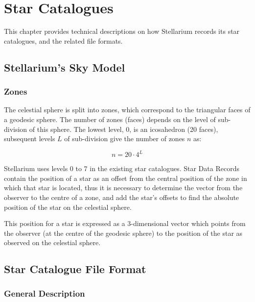 
\chapter{Star Catalogues}
\label{ch:Catalogues}

This chapter provides technical descriptions on how Stellarium records its star catalogues, and
the related file formats.

\section{Stellarium's Sky Model}
\label{sec:Catalogues:SkyModel}

\subsection{Zones}
\label{sec:Catalogues:SkyModel:Zones}

The celestial sphere is split into zones, which correspond to the
triangular faces of a geodesic sphere. The number of zones (faces)
depends on the level of sub-division of this sphere. The lowest level,
0, is an icosahedron (20 faces), subsequent levels $L$ of sub-division
give the number of zones $n$ as:

\begin{equation}
n=20 \cdot 4^L
\end{equation}

Stellarium uses levels 0 to 7 in the existing star catalogues. Star Data
Records contain the position of a star as an offset from the central
position of the zone in which that star is located, thus it is necessary
to determine the vector from the observer to the centre of a zone, and
add the star's offsets to find the absolute position of the star on the
celestial sphere.

This position for a star is expressed as a 3-dimensional vector which
points from the observer (at the centre of the geodesic sphere) to the
position of the star as observed on the celestial sphere.

\section{Star Catalogue File Format}%
\label{sec:Catalogues:stars}

\subsection{General Description}%
\label{sec:Catalogues:stars:general}

